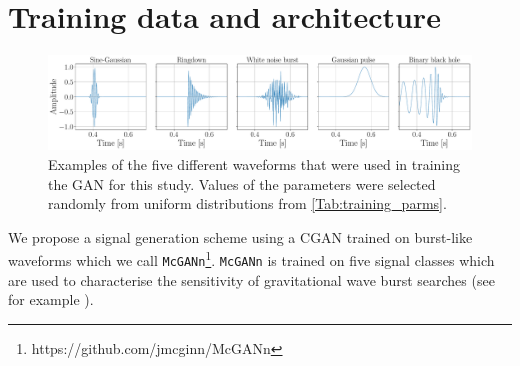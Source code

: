 \documentclass[12pt]{iopart}
\begin{document}
%

\section{Training data and architecture} \label{Method}
%
%
\begin{figure}
    \centering
    \includegraphics[width=\textwidth]{figures/training-sample.pdf}
    \caption{Examples of the five different waveforms that were used in training the \ac{GAN} for this study. Values of the parameters were selected randomly from uniform distributions from \cref{Tab:training_parms}.}
    \label{fig:training_waveforms}
\end{figure}
We propose a signal generation scheme using a CGAN trained on burst-like waveforms which we call \texttt{McGANn}\footnote{https://github.com/jmcginn/McGANn}. \texttt{McGANn} is trained on five signal classes which are used to characterise the sensitivity of gravitational wave burst searches (see for example \cite{PhysRevD.100.024017}). 
\end{document}
